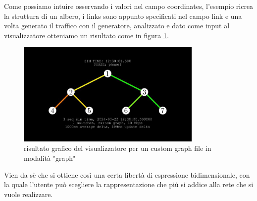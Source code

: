 \documentclass[binding=0.6cm]{sapthesis}
\begin{document}
Come possiamo intuire osservando i valori nel campo coordinates, l'esempio ricrea la struttura di un albero, i links sono appunto specificati 
nel campo link e una volta generato il traffico con il generatore, analizzato e dato come input 
al visualizzatore otteniamo un risultato come in figura \ref{fig:tree_custom}.
\newline
\begin{figure}[h]
    \centering
    \includegraphics[width=0.8\textwidth]{immagini/free_graph.JPG}
    \caption{risultato grafico del visualizzatore per un custom graph file in modalità "graph"}
    \label{fig:tree_custom}
\end{figure}
Vien da sè che si ottiene così una certa libertà di espressione bidimensionale, con la quale l'utente può scegliere
la rappresentazione che più si addice alla rete che si vuole realizzare.
\end{document}
